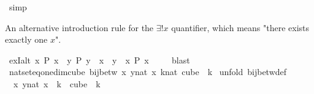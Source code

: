 \begin{isabellebody}
\ simp\isanewline
{}\isamarkupfalse%
%
\endisatagproof
{\isafoldproof}%
%
\isadelimproof
%
\endisadelimproof
%
\begin{isamarkuptext}%
An alternative introduction rule for the $\exists!x$ quantifier, which means "there exists exactly one $x$".%
\end{isamarkuptext}\isamarkuptrue%
\isamarkupfalse%
\ ex{}I{\isacharunderscore}{\kern0pt}alt{\isacharcolon}{\kern0pt}\ {\isachardoublequoteopen}{\isacharparenleft}{\kern0pt}{\isasymexists}x{\isachardot}{\kern0pt}\ P\ x\ {\isasymand}\ {\isacharparenleft}{\kern0pt}{\isasymforall}y{\isachardot}{\kern0pt}\ P\ y\ {\isasymlongrightarrow}\ x\ {\isacharequal}{\kern0pt}\ y{\isacharparenright}{\kern0pt}{\isacharparenright}{\kern0pt}\ {\isasymLongrightarrow}\ {\isacharparenleft}{\kern0pt}{\isasymexists}{\isacharbang}{\kern0pt}x{\isachardot}{\kern0pt}\ P\ x{\isacharparenright}{\kern0pt}{\isachardoublequoteclose}\ \isanewline
%
\isadelimproof
\ \ %
\endisadelimproof
%
\isatagproof
{}\isamarkupfalse%
\ blast%
\endisatagproof
{\isafoldproof}%
%
\isadelimproof
\isanewline
%
\endisadelimproof
{}\isamarkupfalse%
\ nat{\isacharunderscore}{\kern0pt}set{\isacharunderscore}{\kern0pt}eq{\isacharunderscore}{\kern0pt}one{\isacharunderscore}{\kern0pt}dim{\isacharunderscore}{\kern0pt}cube{\isacharcolon}{\kern0pt}\ {\isachardoublequoteopen}bij{\isacharunderscore}{\kern0pt}betw\ {\isacharparenleft}{\kern0pt}{\isasymlambda}x{\isachardot}{\kern0pt}\ {\isasymlambda}y{\isasymin}{\isacharbraceleft}{\kern0pt}{\isachardot}{\kern0pt}{\isachardot}{\kern0pt}{\isacharless}{\kern0pt}{}{\isacharcolon}{\kern0pt}{\isacharcolon}{\kern0pt}nat{\isacharbraceright}{\kern0pt}{\isachardot}{\kern0pt}\ x{\isacharparenright}{\kern0pt}\ {\isacharbraceleft}{\kern0pt}{\isachardot}{\kern0pt}{\isachardot}{\kern0pt}{\isacharless}{\kern0pt}k{\isacharcolon}{\kern0pt}{\isacharcolon}{\kern0pt}nat{\isacharbraceright}{\kern0pt}\ {\isacharparenleft}{\kern0pt}cube\ {}\ k{\isacharparenright}{\kern0pt}{\isachardoublequoteclose}\isanewline
%
\isadelimproof
%
\endisadelimproof
%
\isatagproof
{}\isamarkupfalse%
\ {\isacharparenleft}{\kern0pt}unfold\ bij{\isacharunderscore}{\kern0pt}betw{\isacharunderscore}{\kern0pt}def{\isacharparenright}{\kern0pt}\isanewline
\ \ \isamarkupfalse%
\ {\isacharasterisk}{\kern0pt}{\isacharcolon}{\kern0pt}\ {\isachardoublequoteopen}{\isacharparenleft}{\kern0pt}{\isasymlambda}x{\isachardot}{\kern0pt}\ {\isasymlambda}y{\isasymin}{\isacharbraceleft}{\kern0pt}{\isachardot}{\kern0pt}{\isachardot}{\kern0pt}{\isacharless}{\kern0pt}{}{\isacharcolon}{\kern0pt}{\isacharcolon}{\kern0pt}nat{\isacharbraceright}{\kern0pt}{\isachardot}{\kern0pt}\ x{\isacharparenright}{\kern0pt}\ {\isacharbackquote}{\kern0pt}\ {\isacharbraceleft}{\kern0pt}{\isachardot}{\kern0pt}{\isachardot}{\kern0pt}{\isacharless}{\kern0pt}k{\isacharbraceright}{\kern0pt}\ {\isacharequal}{\kern0pt}\ cube\ {}\ k{\isachardoublequoteclose}\isanewline

\end{isabellebody}
